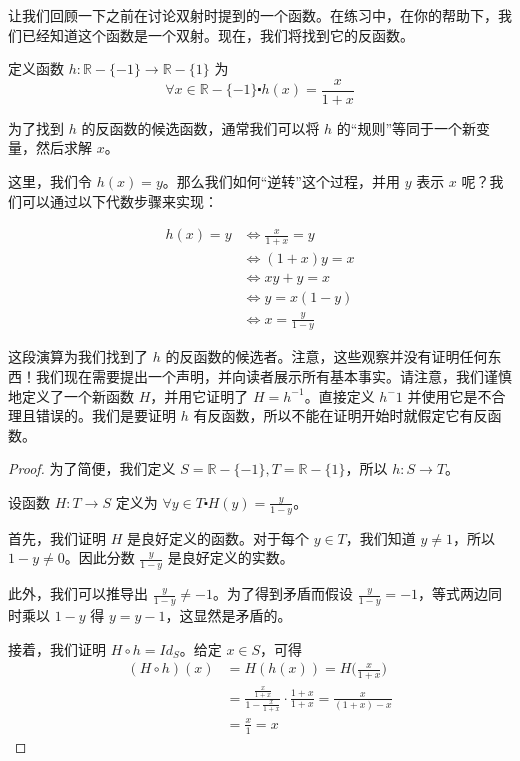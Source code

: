 让我们回顾一下之前在讨论双射时提到的一个函数。在练习中，在你的帮助下，我们已经知道这个函数是一个双射。现在，我们将找到它的反函数。\\

\begin{example}
    定义函数 $h : \mathbb{R} - \{-1\} \to \mathbb{R}- \{1\}$ 为
    \[\forall x \in \mathbb{R} - \{-1\} \centerdot h(x) = \frac{x}{1+x}\]

    为了找到 $h$ 的反函数的候选函数，通常我们可以将 $h$ 的``规则''等同于一个新变量，然后求解 $x$。

    这里，我们令 $h(x) = y$。那么我们如何``逆转''这个过程，并用 $y$ 表示 $x$ 呢？我们可以通过以下代数步骤来实现：

    \begin{align*}
        h(x) = y &\iff \frac{x}{1+x} = y \\
        &\iff (1 + x)y = x \\
        &\iff xy + y = x \\
        &\iff y = x(1 - y) \\
        &\iff x = \frac{y}{1-y}
    \end{align*}

    这段演算为我们找到了 $h$ 的反函数的候选者。注意，这些观察并没有证明任何东西！我们现在需要提出一个声明，并向读者展示所有基本事实。请注意，我们谨慎地定义了一个新函数 $H$，并用它证明了 $H = h^{-1}$。直接定义 $h^-1$ 并使用它是不合理且错误的。我们是要证明 $h$ 有反函数，所以不能在证明开始时就假定它有反函数。

    \begin{proof}
        为了简便，我们定义 $S = \mathbb{R} - \{-1\}, T = \mathbb{R}- \{1\}$，所以 $h:S \to T$。

        设函数 $H: T \to S$ 定义为 $\forall y \in T \centerdot H(y) = \frac{y}{1-y}$。

        首先，我们证明 $H$ 是良好定义的函数。对于每个 $y \in T$，我们知道 $y \ne 1$，所以 $1-y \ne 0$。因此分数 $\frac{y}{1-y}$ 是良好定义的实数。

        此外，我们可以推导出 $\frac{y}{1-y} \ne -1$。为了得到矛盾而假设 $\frac{y}{1-y} = -1$，等式两边同时乘以 $1-y$ 得 $y = y-1$，这显然是矛盾的。

        接着，我们证明 $H \circ h = Id_S$。给定 $x \in S$，可得
        \begin{align*}
            (H \circ h)(x) &= H(h(x)) = H\Big(\frac{x}{1+x}\Big) \\
            &=\frac{\frac{x}{1+x}}{1-\frac{x}{1+x}} \cdot \frac{1+x}{1+x} = \frac{x}{(1+x)-x} \\
            &=\frac{x}{1} = x
        \end{align*}


\end{proof}
\end{example}
